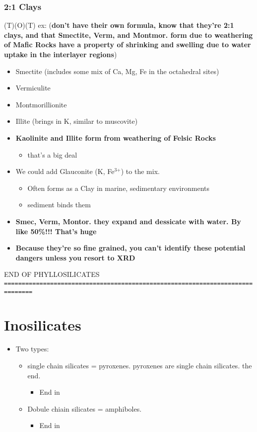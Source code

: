 \documentclass[11pt]{article}
\begin{document}
\subsubsection{2:1 Clays}
\label{sec-4-3-2}
(T)(O)(T)
ex: (\textbf{don't have their own formula, know that they're 2:1 clays, and that Smectite, Verm, and Montmor. form due to weathering of Mafic Rocks have a property of shrinking and swelling due to water uptake in the interlayer regions})
\begin{itemize}
\item Smectite (includes some mix of Ca, Mg, Fe in the octahedral sites)
\item Vermiculite
\item Montmorillionite
\item Illite (brings in K, similar to muscovite)
\item \textbf{Kaolinite and Illite form from weathering of Felsic Rocks}
\begin{itemize}
\item that's a big deal
\end{itemize}
\item We could add Glauconite (K, Fe$^{\text{3+}}$) to the mix.
\begin{itemize}
\item Often forms as a Clay in marine, sedimentary environments
\item sediment binds them
\end{itemize}
\item \textbf{Smec, Verm, Montor. they expand and dessicate with water. By like 50\%!!! That's huge}
\item \textbf{Because they're so fine grained, you can't identify these potential dangers unless you resort to XRD}
\end{itemize}
END OF PHYLLOSILICATES
\texttt{==============================================================================}
\section{Inosilicates}
\label{sec-5}
\begin{itemize}
\item Two types:
\begin{itemize}
\item single chain silicates = pyroxenes. pyroxenes are single chain silicates. the end.
\begin{itemize}
\item End in 
\end{itemize}
\item Dobule chiain silicates = amphiboles.
\begin{itemize}
\item End in 
\end{itemize}
\end{itemize}
\end{itemize}
\end{document}
